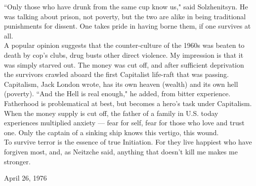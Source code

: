 ``Only those who have drunk from the same cup know us," said Solzhenitsyn. He was talking about prison, not poverty, but the two are alike in being traditional punishments for dissent. One takes pride in having borne them, if one survives at all.\\
A popular opinion suggests that the counter-culture of the 1960s was beaten to death by cop's clubs, drug busts other direct violence. My impression is that it was simply 
starved out. The money was cut off, and after sufficient deprivation the survivors crawled aboard the first Capitalist life-raft that was passing.\\
Capitalism, Jack London wrote, has its own heaven (wealth) and its own hell (poverty). ``And the Hell is real enough," he added, from bitter experience.\\
Fatherhood is problematical at best, but becomes a hero's task under Capitalism. When the money supply is cut off, the father of a family in U.S. today experiences multiplied anxiety --- fear for self, fear for those who love and trust one. Only the captain of a sinking ship knows this vertigo, this wound.\\
To survive terror is the essence of true Initiation. For they live happiest who have forgiven most, and, as Neitzche said, anything that doesn't kill me makes me stronger.
\begin{flushright}
April 26, 1976
\end{flushright}